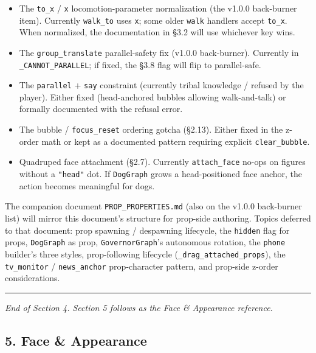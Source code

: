 \documentclass[
  11pt,
]{book}
\providecommand{\tightlist}{%
  \setlength{\itemsep}{0pt}\setlength{\parskip}{0pt}}
\begin{document}
\begin{itemize}
\tightlist
\item
  The \texttt{to\_x} / \texttt{x} locomotion-parameter normalization
  (the v1.0.0 back-burner item). Currently \texttt{walk\_to} uses
  \texttt{x}; some older \texttt{walk} handlers accept \texttt{to\_x}.
  When normalized, the documentation in §3.2 will use whichever key
  wins.
\item
  The \texttt{group\_translate} parallel-safety fix (v1.0.0
  back-burner). Currently in \texttt{\_CANNOT\_PARALLEL}; if fixed, the
  §3.8 flag will flip to parallel-safe.
\item
  The \texttt{parallel} + \texttt{say} constraint (currently tribal
  knowledge / refused by the player). Either fixed (head-anchored
  bubbles allowing walk-and-talk) or formally documented with the
  refusal error.
\item
  The bubble / \texttt{focus\_reset} ordering gotcha (§2.13). Either
  fixed in the z-order math or kept as a documented pattern requiring
  explicit \texttt{clear\_bubble}.
\item
  Quadruped face attachment (§2.7). Currently \texttt{attach\_face}
  no-ops on figures without a \texttt{"head"} dot. If \texttt{DogGraph}
  grows a head-positioned face anchor, the action becomes meaningful for
  dogs.
\end{itemize}

The companion document \texttt{PROP\_PROPERTIES.md} (also on the v1.0.0
back-burner list) will mirror this document's structure for prop-side
authoring. Topics deferred to that document: prop spawning / despawning
lifecycle, the \texttt{hidden} flag for props, \texttt{DogGraph} as
prop, \texttt{GovernorGraph}'s autonomous rotation, the \texttt{phone}
builder's three styles, prop-following lifecycle
(\texttt{\_drag\_attached\_props}), the \texttt{tv\_monitor} /
\texttt{news\_anchor} prop-character pattern, and prop-side z-order
considerations.

\begin{center}\rule{0.5\linewidth}{0.5pt}\end{center}

\emph{End of Section 4. Section 5 follows as the Face \& Appearance
reference.}

\subsection{5. Face \& Appearance}\label{face-appearance}
\end{document}
